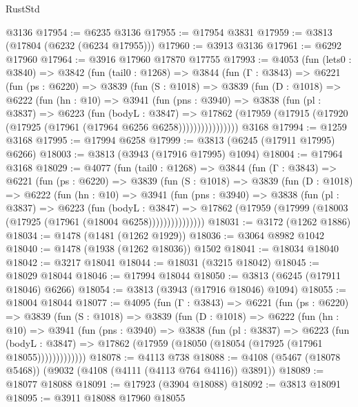 \begin{lexlean}{RustStd}
\begin{coremodule}
    @3136
@17954 := @6235 @3136
@17955 := @17954 @3831
@17959 := @3813 (@17804 (@6232 (@6234 @17955)))
@17960 := @3913 @3136
@17961 := @6292 @17960
@17964 := @3916 @17960 @17870 @17755
@17993 := @4053
    (fun (lets0 : @3840) =>
    @3842
      (fun (tail0 : @1268) =>
      @3844
        (fun (Γ : @3843) =>
        @6221
          (fun (ps : @6220) =>
          @3839
            (fun (S : @1018) =>
            @3839
              (fun (D : @1018) =>
              @6222
                (fun (hn : @10) =>
                @3941
                  (fun (pns : @3940) =>
                  @3838
                    (fun (pl : @3837) =>
                    @6223
                      (fun (bodyL : @3847) =>
                      @17862
                        (@17959 (@17915 (@17920 (@17925 (@17961 (@17964 @6256 @6258))))))))))))))))
    @3168
@17994 := @1259 @3168
@17995 := @17994 @6258
@17999 := @3813 (@6245 (@17911 @17995) @6266)
@18003 := @3813 (@3943 (@17916 @17995) @1094)
@18004 := @17964 @3168
@18029 := @4077
    (fun (tail0 : @1268) =>
    @3844
      (fun (Γ : @3843) =>
      @6221
        (fun (ps : @6220) =>
        @3839
          (fun (S : @1018) =>
          @3839
            (fun (D : @1018) =>
            @6222
              (fun (hn : @10) =>
              @3941
                (fun (pns : @3940) =>
                @3838
                  (fun (pl : @3837) =>
                  @6223
                    (fun (bodyL : @3847) =>
                    @17862 (@17959 (@17999 (@18003 (@17925 (@17961 (@18004 @6258)))))))))))))))
@18031 := @3172 (@1262 @1886)
@18034 := @1478 (@1481 (@1262 @1929))
@18036 := @3064 @8982 @1042
@18040 := @1478 (@1938 (@1262 @18036)) @1502
@18041 := @18034 @18040
@18042 := @3217 @18041
@18044 := @18031 (@3215 @18042)
@18045 := @18029 @18044
@18046 := @17994 @18044
@18050 := @3813 (@6245 (@17911 @18046) @6266)
@18054 := @3813 (@3943 (@17916 @18046) @1094)
@18055 := @18004 @18044
@18077 := @4095
    (fun (Γ : @3843) =>
    @6221
      (fun (ps : @6220) =>
      @3839
        (fun (S : @1018) =>
        @3839
          (fun (D : @1018) =>
          @6222
            (fun (hn : @10) =>
            @3941
              (fun (pns : @3940) =>
              @3838
                (fun (pl : @3837) =>
                @6223
                  (fun (bodyL : @3847) =>
                  @17862 (@17959 (@18050 (@18054 (@17925 (@17961 @18055)))))))))))))
@18078 := @4113 @738
@18088 := @4108 (@5467 (@18078 @5468)) (@9032 (@4108 (@4111 (@4113 @764 @4116)) @3891))
@18089 := @18077 @18088
@18091 := @17923 (@3904 @18088)
@18092 := @3813 @18091
@18095 := @3911 @18088 @17960 @18055

\end{coremodule}
\end{lexlean}
